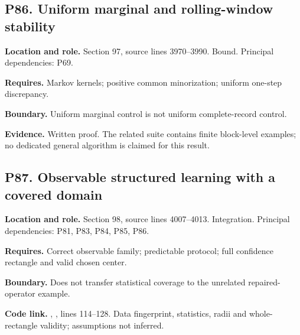 \documentclass[11pt,oneside,openany]{book}
\numberwithin{equation}{section}
\begin{document}
\par\noindent\begin{minipage}{\textwidth}
\subsection{P86. Uniform marginal and rolling-window
stability}\label{LSMRegister:p86.-uniform-marginal-and-rolling-window-stability}

\textbf{Location and role.} Section 97, source lines 3970--3990. Bound.
Principal dependencies: P69.

\textbf{Requires.} Markov kernels; positive common minorization; uniform
one-step discrepancy.

\textbf{Boundary.} Uniform marginal control is not uniform
complete-record control.

\textbf{Evidence.} Written proof. The related suite contains finite
block-level examples; no dedicated general algorithm is claimed for this
result.
\end{minipage}\par\medskip

\par\noindent\begin{minipage}{\textwidth}
\subsection{P87. Observable structured learning with a covered
domain}\label{LSMRegister:p87.-observable-structured-learning-with-a-covered-domain}

\textbf{Location and role.} Section 98, source lines 4007--4013.
Integration. Principal dependencies: P81, P83, P84, P85, P86.

\textbf{Requires.} Correct observable family; predictable protocol; full
confidence rectangle and valid chosen center.

\textbf{Boundary.} Does not transfer statistical coverage to the
unrelated repaired-operator example.

\textbf{Code link.} ,
, lines 114--128. Data fingerprint,
statistics, radii and whole-rectangle validity; assumptions not
inferred.
\end{minipage}\par\medskip

\endgroup
\end{document}
